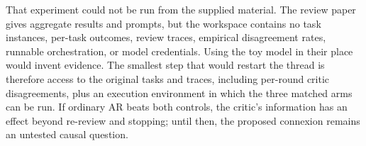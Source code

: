 \documentclass{article}
\begin{document}
That experiment could not be run from the supplied material. The review paper gives aggregate results and prompts, but the workspace contains no task instances, per-task outcomes, review traces, empirical disagreement rates, runnable orchestration, or model credentials. Using the toy model in their place would invent evidence. The smallest step that would restart the thread is therefore access to the original tasks and traces, including per-round critic disagreements, plus an execution environment in which the three matched arms can be run. If ordinary AR beats both controls, the critic's information has an effect beyond re-review and stopping; until then, the proposed connexion remains an untested causal question.

\enlargethispage{3\baselineskip}


\end{document}
